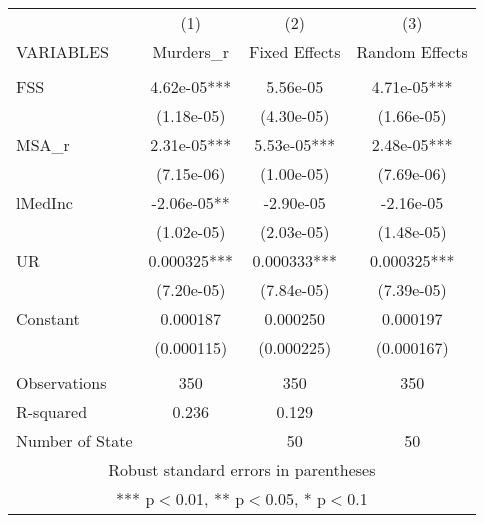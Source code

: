 \documentclass[]{article}
\begin{document}
\begin{tabular}{lccc} \hline
 & (1) & (2) & (3) \\
VARIABLES & Murders\_r & Fixed Effects & Random Effects \\ \hline
 &  &  &  \\
FSS & 4.62e-05*** & 5.56e-05 & 4.71e-05*** \\
 & (1.18e-05) & (4.30e-05) & (1.66e-05) \\
MSA\_r & 2.31e-05*** & 5.53e-05*** & 2.48e-05*** \\
 & (7.15e-06) & (1.00e-05) & (7.69e-06) \\
lMedInc & -2.06e-05** & -2.90e-05 & -2.16e-05 \\
 & (1.02e-05) & (2.03e-05) & (1.48e-05) \\
UR & 0.000325*** & 0.000333*** & 0.000325*** \\
 & (7.20e-05) & (7.84e-05) & (7.39e-05) \\
Constant & 0.000187 & 0.000250 & 0.000197 \\
 & (0.000115) & (0.000225) & (0.000167) \\
 &  &  &  \\
Observations & 350 & 350 & 350 \\
R-squared & 0.236 & 0.129 &  \\
 Number of State &  & 50 & 50 \\ \hline
\multicolumn{4}{c}{ Robust standard errors in parentheses} \\
\multicolumn{4}{c}{ *** p$<$0.01, ** p$<$0.05, * p$<$0.1} \\
\end{tabular}
\end{document}
